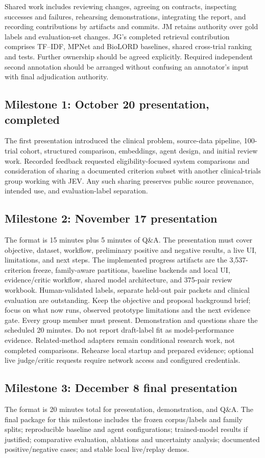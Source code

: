 \documentclass[10pt,letterpaper]{article}
\begin{document}
Shared work includes reviewing changes, agreeing on contracts, inspecting
successes and failures, rehearsing demonstrations, integrating the report,
and recording contributions by artifacts and commits. JM retains authority
over gold labels and evaluation-set changes. JG's completed retrieval
contribution comprises TF--IDF, MPNet and BioLORD baselines, shared cross-trial
ranking and tests. Further ownership should be agreed explicitly. Required
independent second annotation should be arranged
without confusing an annotator's input with final adjudication authority.

\subsection{Milestone 1: October 20 presentation, completed}
The first presentation introduced the clinical problem, source-data pipeline,
100-trial cohort, structured comparison, embeddings, agent design, and initial review work.
Recorded feedback requested eligibility-focused system comparisons and
consideration of sharing a documented criterion subset with another
clinical-trials group working with JEV. Any such sharing preserves public
source provenance, intended use, and evaluation-label separation.

\subsection{Milestone 2: November 17 presentation}
The format is 15 minutes plus 5 minutes of Q\&A. The presentation must cover
objective, dataset, workflow, preliminary positive and negative results, a
live UI, limitations, and next steps.
The implemented progress artifacts are the 3,537-criterion freeze, family-aware
partitions, baseline backends and local UI, evidence/critic workflow, shared
model architecture, and 375-pair review workbook. Human-validated labels,
separate held-out pair packets and clinical evaluation are outstanding.
Keep the objective and proposal background brief; focus on what now runs,
observed prototype limitations and the next evidence gate. Every group member
must present. Demonstration and questions share the scheduled 20 minutes.
Do not report draft-label fit as model-performance evidence. Related-method
adapters remain conditional research work, not completed comparisons.
Rehearse local startup and prepared evidence; optional live judge/critic
requests require network access and configured credentials.

\subsection{Milestone 3: December 8 final presentation}
The format is 20 minutes total for presentation, demonstration, and Q\&A.
The final package for this milestone includes the frozen corpus/labels and
family splits; reproducible baseline and agent configurations; trained-model
results if justified; comparative evaluation, ablations and uncertainty
analysis; documented positive/negative cases; and stable local live/replay demos.
\end{document}
